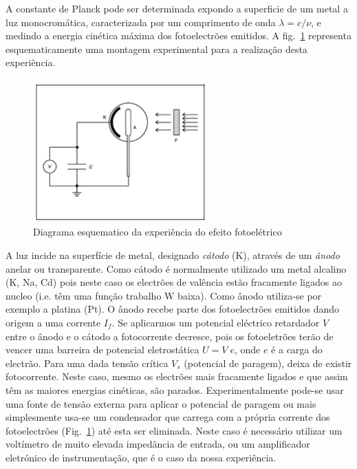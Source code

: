 \documentclass[a4paper,12pt]{article}  %
\begin{document}

A constante de Planck pode ser determinada expondo a superficie de um metal a luz monocromática, caracterizada por um comprimento de onda $\lambda=c /\nu$, e medindo a energia cinética máxima dos fotoelectrões emitidos. A fig.~\ref{fig:plack_exp} representa esquematicamente uma montagem experimental para a realização desta experiência.

\begin{figure}[htb] 
	\centering 
	\includegraphics[width=0.6\textwidth]{planck_exp} 
	\caption{Diagrama esquematico da experiência do efeito fotoelétrico} \label{fig:plack_exp}
\end{figure}


A luz incide na superfície de metal, designado \emph{cátodo} (K), através de um \emph{ânodo} anelar ou transparente. Como cátodo é normalmente utilizado um metal alcalino (K, Na, Cd)  pois neste caso os electrões de valência estão fracamente ligados ao nucleo (i.e. têm uma função trabalho W baixa). Como ânodo utiliza-se por exemplo a platina  (Pt). O ânodo recebe parte dos fotoelectrões emitidos dando origem a uma corrente $I_f$. Se aplicarmos um potencial eléctrico retardador $V$ entre o ânodo e o cátodo a fotocorrente decresce, pois os fotoeletrões terão de vencer uma barreira de  potencial eletrostática $U=V\;e$, onde $e$ é a carga do electrão. 
Para uma dada tensão crítica $V_s$ (potencial de paragem), deixa de existir fotocorrente. Neste caso, mesmo os electrões mais fracamente ligados e que assim têm as maiores energias cinéticas, são parados. Experimentalmente pode-se usar uma fonte de tensão externa para aplicar o potencial de paragem ou mais simplesmente usa-se um condensador que carrega com a própria corrente dos fotoelectrões (Fig.~\ref{fig:plack_exp}) até esta ser eliminada. Neste caso é necessário utilizar um voltímetro de muito elevada impedância de entrada, ou um amplificador eletrónico de instrumentação, que é o caso da nossa experiência.
\end{document}
